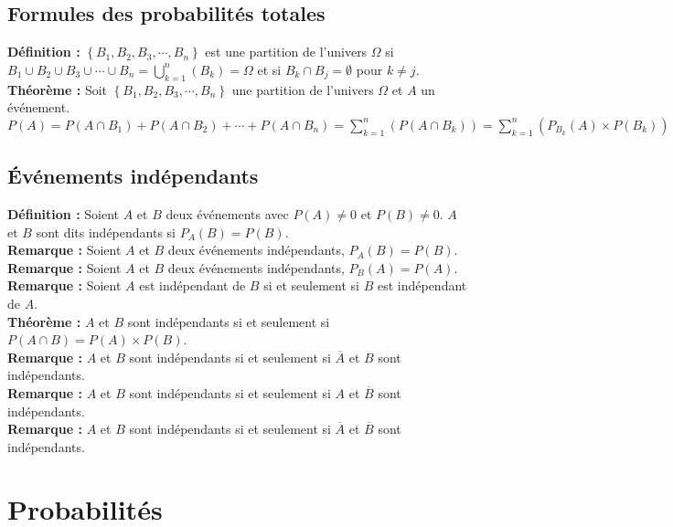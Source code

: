 \documentclass[a4paper,titlepage]{article}
\let\oldsection\section
\renewcommand\section{\clearpage\oldsection}
\begin{document}
    \subsection{Formules des probabilités totales}
        \textbf{Définition :} $\left\{B_{1},B_{2},B_{3},\cdots,B_{n}\right\}$ est une partition de l’univers $\varOmega$ si $B_{1}\cup B_{2}\cup B_{3}\cup\cdots\cup B_{n}=\bigcup\limits_{k=1}^{n}\left(B_{k}\right)=\varOmega$ et si $B_{k}\cap B_{j}=\emptyset$ pour $k\neq j$.
        \\
        \textbf{Théorème :} Soit $\left\{B_{1},B_{2},B_{3},\cdots,B_{n}\right\}$ une partition de l’univers $\varOmega$ et $A$ un événement.\linebreak $P\left(A\right)=P\left(A\cap B_{1}\right)+P\left(A\cap B_{2}\right)+\cdots+P\left(A\cap B_{n}\right)=\sum\limits_{k=1}^{n}\left(P\left(A\cap B_{k}\right)\right)=\sum\limits_{k=1}^{n}\left(P_{B_{k}}\left(A\right)\times P\left( B_{k}\right)\right)$
    \subsection{Événements indépendants}
        \textbf{Définition :} Soient $A$ et $B$ deux événements avec $P\left(A\right)\neq0$ et $P\left(B\right)\neq0$. $A$ et $B$ sont dits indépendants si $P_{A}\left(B\right)=P\left(B\right)$.
        \\
        \textbf{Remarque :} Soient $A$ et $B$ deux événements indépendants, $P_{A}\left(B\right)=P\left(B\right)$.
        \\
        \textbf{Remarque :} Soient $A$ et $B$ deux événements indépendants, $P_{B}\left(A\right)=P\left(A\right)$.
        \\
        \textbf{Remarque :} Soient $A$ est indépendant de $B$ si et seulement si $B$ est indépendant de $A$.
        \\
        \textbf{Théorème :} $A$ et $B$ sont indépendants si et seulement si $P\left(A\cap B\right)=P\left(A\right)\times P\left(B\right)$.
        \\
        \textbf{Remarque :} $A$ et $B$ sont indépendants si et seulement si $\overline{A}$ et $B$ sont indépendants.
        \\
        \textbf{Remarque :} $A$ et $B$ sont indépendants si et seulement si $A$ et $\overline{B}$ sont indépendants.
        \\
        \textbf{Remarque :} $A$ et $B$ sont indépendants si et seulement si $\overline{A}$ et $\overline{B}$ sont indépendants.
\section{Probabilités}
\end{document}
